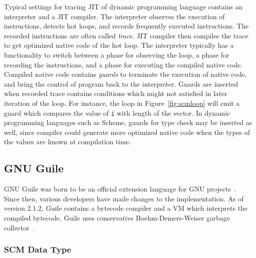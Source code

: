 \documentclass[preprint, 10pt]{sigplanconf}
\begin{document}
Typical settings for tracing JIT of dynamic programming language contains an
interpreter and a JIT compiler. The interpreter observes the execution of
instructions, detects hot loops, and records frequently executed
instructions. The recorded instructions are often called \textit{trace}. JIT
compiler then compiles the trace to get optimized native code of the hot
loop. The interpreter typically has a functionality to switch between a phase
for observing the loop, a phase for recording the instructions, and a phase for
executing the compiled native code.  Compiled native code contains
\textit{guards} to terminate the execution of native code, and bring the control
of program back to the interpreter. Guards are inserted when recorded trace
contains conditions which might not satisfied in later iteration of the
loop. For instance, the loop in Figure~\hyperref[fig:scmloop]{\ref{fig:scmloop}}
will emit a guard which compares the value of \texttt{i} with length of the
vector. In dynamic programming languages such as Scheme, guards for type check
may be inserted as well, since compiler could generate more optimized native
code when the types of the values are known at compilation time.

\subsection{GNU Guile}
\label{sec:backgroundguile}

GNU Guile was born to be an official extension language for GNU
projects~\cite{Galassi02guilereference}. Since then, various developers have
made changes to the implementation. As of version 2.1.2, Guile contains a
bytecode compiler and a VM which interprets the compiled bytecode. Guile uses
conservative Boehm-Demers-Weiser garbage collector~\cite{boehm1988garbage}.


\subsubsection{SCM Data Type}
\label{sec:scmdatatype}
\end{document}
